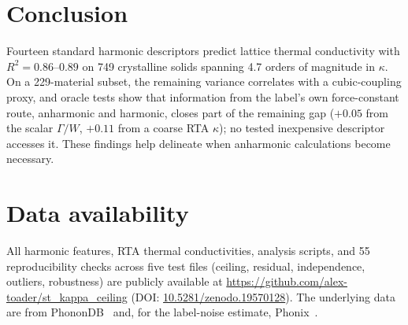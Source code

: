 \documentclass[aps,prm,reprint,onecolumn,groupedaddress]{revtex4-2}
\begin{document}
\section{Conclusion}

Fourteen standard harmonic descriptors predict lattice thermal conductivity with $R^2 = 0.86$--$0.89$ on 749 crystalline solids spanning 4.7 orders of magnitude in $\kappa$. On a 229-material subset, the remaining variance correlates with a cubic-coupling proxy, and oracle tests show that information from the label's own force-constant route, anharmonic and harmonic, closes part of the remaining gap ($+0.05$ from the scalar $\Gamma/W$, $+0.11$ from a coarse RTA $\kappa$); no tested inexpensive descriptor accesses it. These findings help delineate when anharmonic calculations become necessary.

\section*{Data availability}

All harmonic features, RTA thermal conductivities, analysis scripts, and 55 reproducibility checks across five test files (ceiling, residual, independence, outliers, robustness) are publicly available at \url{https://github.com/alex-toader/st_kappa_ceiling} (DOI: \href{https://doi.org/10.5281/zenodo.19570128}{10.5281/zenodo.19570128}). The underlying data are from PhononDB~\cite{phonondb} and, for the label-noise estimate, Phonix~\cite{ohnishi2026}.
\end{document}
